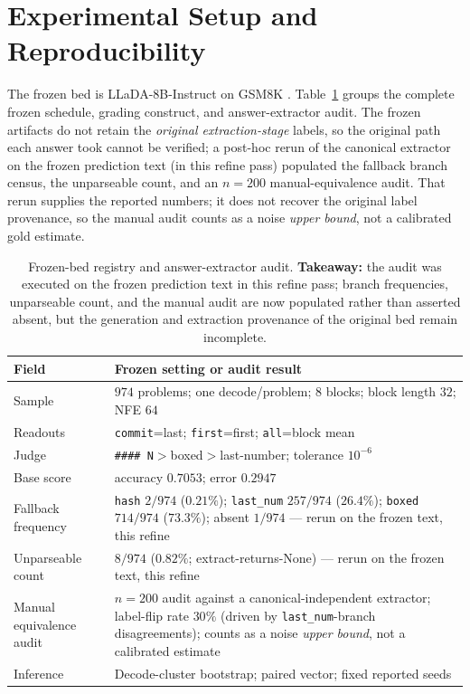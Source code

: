 \documentclass{article}
\begin{document}
\section{Experimental Setup and Reproducibility}
\label{sec:setup}

The frozen bed is LLaDA-8B-Instruct \citep{llda} on GSM8K
\citep{cobbe2021training}.  Table~\ref{tab:bed} groups the complete frozen schedule, grading
construct, and answer-extractor audit.  The frozen artifacts do not retain the
\emph{original extraction-stage} labels, so the original path each answer took cannot be
verified; a post-hoc rerun of the canonical extractor on the frozen prediction text (in this
refine pass) populated the fallback branch census, the unparseable count, and an $n=200$
manual-equivalence audit.  That rerun supplies the reported numbers; it does not recover the
original label provenance, so the manual audit counts as a noise \emph{upper bound}, not a
calibrated gold estimate.

\begin{table}[!htbp]
\caption{Frozen-bed registry and answer-extractor audit.  \textbf{Takeaway:} the audit was
executed on the frozen prediction text in this refine pass; branch frequencies, unparseable
count, and the manual audit are now populated rather than asserted absent, but the
generation and extraction provenance of the original bed remain incomplete.}
\label{tab:bed}
\centering\small
\begin{tabularx}{\linewidth}{@{}l>{\raggedright\arraybackslash}X@{}}
\toprule
Field & Frozen setting or audit result \\
\midrule
Sample & $974$ problems; one decode/problem; $8$ blocks; block length $32$; NFE $64$ \\
Readouts & \texttt{commit}=last; \texttt{first}=first; \texttt{all}=block mean \\
Judge & \texttt{\#\#\#\# N}$>$boxed$>$last-number; tolerance $10^{-6}$ \\
Base score & accuracy $0.7053$; error $0.2947$ \\
Fallback frequency & \texttt{hash} $2/974$ ($0.21\%$); \texttt{last\_num} $257/974$ ($26.4\%$); \texttt{boxed} $714/974$ ($73.3\%$); absent $1/974$ --- rerun on the frozen text, this refine \\
Unparseable count & $8/974$ ($0.82\%$; extract-returns-None) --- rerun on the frozen text, this refine \\
Manual equivalence audit & $n=200$ audit against a canonical-independent extractor; label-flip rate $30\%$ (driven by \texttt{last\_num}-branch disagreements); counts as a noise \emph{upper bound}, not a calibrated estimate \\
Inference & Decode-cluster bootstrap; paired vector; fixed reported seeds \\
\bottomrule
\end{tabularx}
\end{table}
\end{document}
